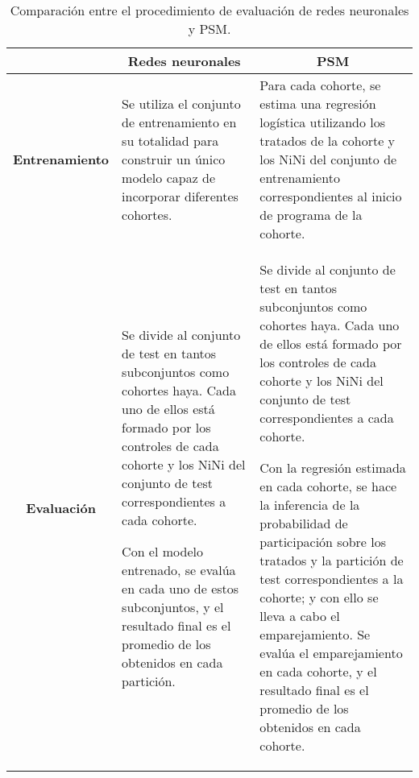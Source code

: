 \documentclass[../../main.tex]{subfiles}
\begin{document}
\begin{table}[ht]
    \centering
    \renewcommand{\arraystretch}{1.3} %
    \begin{tabularx}{\textwidth}{|c|X|X|}
        \hline
         & \multicolumn{1}{c|}{\textbf{Redes neuronales}} & \multicolumn{1}{c|}{\textbf{PSM}} \\ \hline
        \textbf{Entrenamiento}
            & Se utiliza el conjunto de entrenamiento en su totalidad para construir
            un único modelo capaz de incorporar diferentes cohortes.

            & Para cada cohorte, se estima una regresión logística utilizando los tratados
            de la cohorte y los NiNi del conjunto de entrenamiento correspondientes al
            inicio de programa de la cohorte. %
        \\ \hline
        \textbf{Evaluación}
            & Se divide al conjunto de test en tantos subconjuntos como cohortes haya.
            Cada uno de ellos está formado por los controles de cada cohorte y los NiNi
            del conjunto de test correspondientes a cada cohorte.

            Con el modelo entrenado, se evalúa en cada uno de estos subconjuntos, y el
            resultado final es el promedio de los obtenidos en cada partición.

            & Se divide al conjunto de test en tantos subconjuntos como cohortes haya.
            Cada uno de ellos está formado por los controles de cada cohorte y los NiNi
            del conjunto de test correspondientes a cada cohorte.

            Con la regresión estimada en cada cohorte, se hace la inferencia de la
            probabilidad de participación sobre los tratados y la partición de test
            correspondientes a la cohorte; y con ello se lleva a cabo el emparejamiento.
            Se evalúa el emparejamiento en cada cohorte, y el resultado final es el
            promedio de los obtenidos en cada cohorte.
        \\ \hline
    \end{tabularx}
    \caption{Comparación entre el procedimiento de evaluación de redes neuronales y PSM.}
    \label{tab:comparacion}
\end{table}
\end{document}
